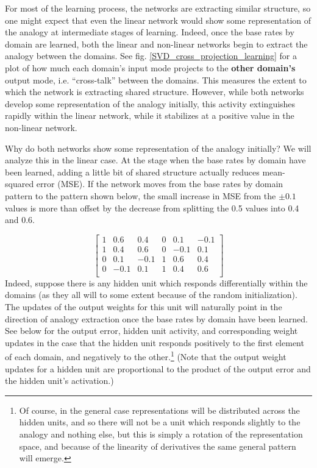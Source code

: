 \documentclass[10pt,letterpaper]{article}
\begin{document}
For most of the learning process, the networks are extracting similar structure, so one might expect that even the linear network would show some representation of the analogy at intermediate stages of learning. Indeed, once the base rates by domain are learned, both the linear and non-linear networks begin to extract the analogy between the domains. See fig. \ref{SVD_cross_projection_learning} for a plot of how much each domain's input mode projects to the \textbf{other domain's} output mode, i.e. ``cross-talk'' between the domains. This measures the extent to which the network is extracting shared structure. However, while both networks develop some representation of the analogy initially, this activity extinguishes rapidly within the linear network, while it stabilizes at a positive value in the non-linear network. \par
Why do both networks show some representation of the analogy initially? We will analyze this in the linear case. At the stage when the base rates by domain have been learned, adding a little bit of shared structure actually reduces mean-squared error (MSE). If the network moves from the base rates by domain pattern to the pattern shown below, the small increase in MSE from the \(\pm 0.1\) values is more than offset by the decrease from splitting the 0.5 values into 0.4 and 0.6. \par 
{ 
\[
\left[ \begin{matrix} 
1 & 0.6 & 0.4 & 0 & 0.1 & -0.1 \\
1 & 0.4 & 0.6 & 0 & -0.1 & 0.1 \\
0 & 0.1 & -0.1 & 1 & 0.6 & 0.4  \\
0 & -0.1 & 0.1 & 1 & 0.4 & 0.6  \\
\end{matrix}  \right] 
\] 
}
Indeed, suppose there is any hidden unit which responds differentially within the domains (as they all will to some extent because of the random initialization). The updates of the output weights for this unit will naturally point in the direction of analogy extraction once the base rates by domain have been learned. See below for the output error, hidden unit activity, and corresponding weight updates in the case that the hidden unit responds positively to the first element of each domain, and negatively to the other.\footnote{Of course, in the general case representations will be distributed across the hidden units, and so there will not be a unit which responds slightly to the analogy and nothing else, but this is simply a rotation of the representation space, and because of the linearity of derivatives the same general pattern will emerge.} (Note that the output weight updates for a hidden unit are proportional to the product of the output error and the hidden unit's activation.) \par
\end{document}
